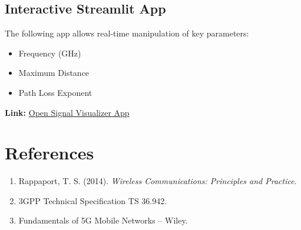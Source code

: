 \subsection{Interactive Streamlit App}
The following app allows real-time manipulation of key parameters:
\begin{itemize}
  \item Frequency (GHz)
  \item Maximum Distance
  \item Path Loss Exponent
\end{itemize}

\textbf{Link:} \href{http://<your-deployed-url>:8501}{Open Signal Visualizer App}

\section{References}
\begin{enumerate}
  \item Rappaport, T. S. (2014). \textit{Wireless Communications: Principles and Practice}.
  \item 3GPP Technical Specification TS 36.942.
  \item Fundamentals of 5G Mobile Networks – Wiley.
\end{enumerate}
